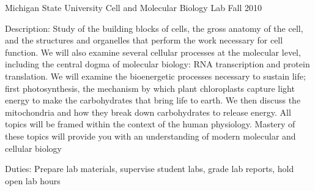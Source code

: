 \begin{cventries}
  \cventry
    {Michigan State University} %
    {Cell and Molecular Biology Lab} %
    {} %
    {Fall 2010} %
    {
      \begin{cvitems} %
        \item {Description: Study of the building blocks of cells, the gross anatomy of the cell, and the structures and organelles that perform the work necessary for cell function. We will also examine several cellular processes at the molecular level, including the central dogma of molecular biology: RNA transcription and protein translation. We will examine the bioenergetic processes necessary to sustain life; first photosynthesis, the mechanism by which plant chloroplasts capture light energy to make the carbohydrates that bring life to earth. We then discuss the mitochondria and how they break down carbohydrates to release energy. All topics will be framed within the context of the human physiology. Mastery of these topics will provide you with an understanding of modern molecular and cellular biology}
        \item {Duties: Prepare lab materials, supervise student labs, grade lab reports, hold open lab hours}
      \end{cvitems}
    }

\end{cventries}




